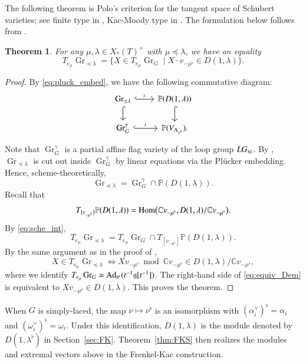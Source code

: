 \documentclass[a4paper, 12pt]{amsart}
\newtheorem{theorem}{Theorem}[section]
\theoremstyle{definition}
\newcommand{\C}{\mathbb C}
\newcommand{\g}{\mathfrak g}
\DeclareMathOperator{\Gr}{\mathrm{Gr}}
\begin{document}
The following theorem is Polo's criterion for the tangent space of Schubert
varieties; see finite type in \cite{Po}, Kac-Moody type in
\cite[Exercise~12.1.E(9)]{Ku}. The formulation below follows from
\cite[Theorem~4.2]{HLR}.

\begin{theorem}\label{thm:polo}
For any $\mu,\lambda\in X_*(T)^+$ with $\mu\preceq\lambda$, we have an equality
\[
T_{e_\mu}\Gr_{\preceq\lambda}
=\{X\in T_{e_\mu}\Gr_G\mid X\cdot v_{-\mu^\flat}\in D(1,\lambda)\}.
\]
\end{theorem}

\begin{proof}
By \eqref{eq:pluck_embed}, we have the following commutative diagram:
\[
\begin{tikzcd}
\Gr_{\preceq\lambda}\arrow[r,hook,"\iota"]\arrow[d,hook]
&\mathbb P(D(1,\lambda))\arrow[d,hook]\\
\Gr_G^{\gamma}\arrow[r,hook,"\iota"]
&\mathbb P( V_{\Lambda_{\gamma^\flat}}).
\end{tikzcd}
\]
Note that $\Gr_G^{\gamma}$ is a partial affine flag variety of the loop group $LG_{\rm sc}$. By \cite[Theorem~4.2]{HLR},  $\Gr_{\preceq\lambda}$ is cut out inside
$\Gr_G^{\gamma}$ by linear equations via the Pl\"ucker embedding.
Hence, scheme-theoretically,
\begin{equation}\label{eq:sche_int}
\Gr_{\preceq\lambda}
=\Gr_G^{\gamma}\cap\mathbb P(D(1,\lambda)).
\end{equation}
Recall that
\[
T_{[v_{-\mu^\flat}]}\mathbb P(D(1,\lambda))
=
{\rm Hom}\bigl(\C v_{-\mu^\flat},
D(1,\lambda)/\C v_{-\mu^\flat}\bigr).
\]
By \eqref{eq:sche_int},
\[
T_{e_\mu}\Gr_{\preceq\lambda}
=T_{e_\mu}\Gr_G\cap
T_{[v_{-\mu^\flat}]}\mathbb P(D(1,\lambda)).
\]
By the same argument as in the proof of \cite[Corollary~4.3]{HLR},
\begin{equation}\label{eq:equiv_Dem}
X\in T_{e_\mu}\Gr_{\preceq\lambda}
\iff
Xv_{-\mu^\flat}\bmod\C v_{-\mu^\flat}
\in D(1,\lambda)/\C v_{-\mu^\flat},
\end{equation}
where we identify
$T_{e_\mu}\Gr_G\simeq{\rm Ad}_{t^\mu}(t^{-1}\g[t^{-1}])$.
The right-hand side of \eqref{eq:equiv_Dem} is equivalent to
$Xv_{-\mu^\flat}\in D(1,\lambda)$. This proves the theorem.
\end{proof}

When $G$ is simply-laced, the map $\nu\mapsto\nu^\flat$ is an
isomorphism with $(\alpha_i^\vee)^\flat=\alpha_i$ and
$(\omega_i^\vee)^\flat=\omega_i$. Under this identification, $D(1,\lambda)$
is the module denoted by $D(1,\lambda^\flat)$ in Section~\ref{sec:FK}.
Theorem~\ref{thm:FKS} then realizes the modules and extremal vectors above
in the Frenkel-Kac construction.
\end{document}
